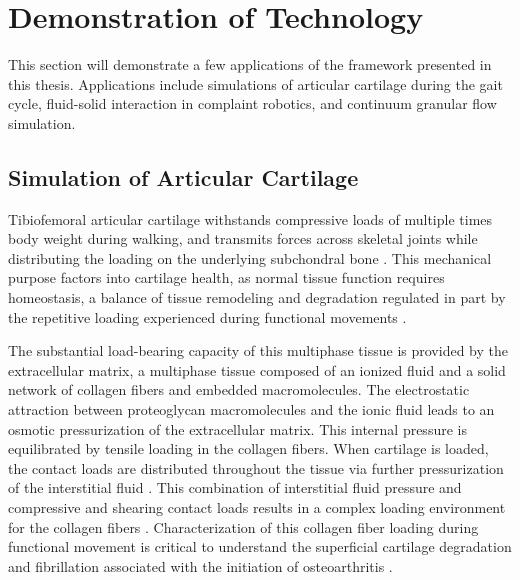 \chapter{Demonstration of Technology}
\label{chap:demonstration}
This section will demonstrate a few applications of the framework presented in this thesis. Applications include simulations of articular cartilage during the gait cycle, fluid-solid interaction in complaint robotics, and continuum granular flow simulation.

\section{Simulation of Articular Cartilage}\label{sec:AC_model}
Tibiofemoral articular cartilage withstands compressive loads of multiple times body weight during walking, and transmits forces across skeletal joints while distributing the loading on the underlying subchondral bone \cite{Kutzner2010}. This mechanical purpose factors into cartilage health, as normal tissue function requires homeostasis, a balance of tissue remodeling and degradation regulated in part by the repetitive loading experienced during functional movements \cite{griffin2005}.

The substantial load-bearing capacity of this multiphase tissue is provided by the extracellular matrix, a multiphase tissue composed of an ionized fluid and a solid network of collagen fibers and embedded macromolecules. The electrostatic attraction between proteoglycan macromolecules and the ionic fluid leads to an osmotic pressurization of the extracellular matrix. This internal pressure is equilibrated by tensile loading in the collagen fibers. When cartilage is loaded, the contact loads are distributed throughout the tissue via further pressurization of the interstitial fluid \cite{Cohen1998, Fox2009}. This combination of interstitial fluid pressure and compressive and shearing contact loads results in a complex loading environment for the collagen fibers \cite{Briant2015,Kaab1998,Notzli1997}. Characterization of this collagen fiber loading during functional movement is critical to understand the superficial cartilage degradation and fibrillation associated with the initiation of osteoarthritis \cite{Andriacchi2004,Carter2004,griffin2005,Poole2002}.

